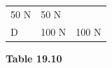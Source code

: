 \begin{enumerate}[noitemsep, label=\textbf{\arabic*}. ]
{\begin{center}
\begin{xtabular*}{\mytablewidth}[t]{|p{10\mystarwidth}|p{10\mystarwidth}|p{10\mystarwidth}|}
    
        50 N &
    
    
        50 N%
     \tabularnewline{}
    
    
        D &
    
    
        100 N &
    
    
        100 N%
     \tabularnewline{}
    \end{xtabular*}
      \end{center}
    \begin{center}{\small\bfseries Table 19.10}\end{center}
    
    \addtocounter{footnote}{-0}
    
        }%
      

\end{enumerate}
